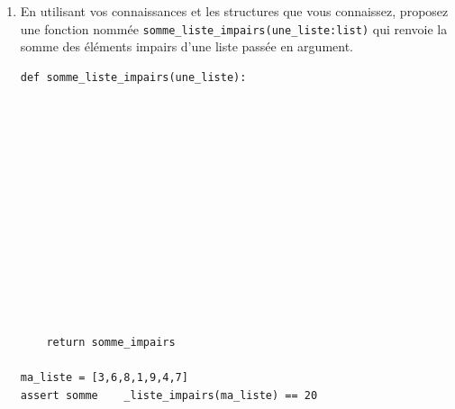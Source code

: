\documentclass[a4paper,12pt,openany]{book}
\begin{document}
\begin{enumerate}
\begin{lstlisting}[numbers=none]
def recherche_minimum(une_liste):
		''' Fonction renvoyant la valeur maximale d'une liste
		Entrée:
		- une_liste: liste de n valeurs de type int
		Sortie:
		- minimum: minimum de la liste (type int) '''
















		return minimum
		
ma_liste = [3,6,8,1,9,4,7]
assert recherche_minimum(ma_liste) == 1
\end{lstlisting}	
	
	
	\bigskip
	
	\item En utilisant vos connaissances et les structures que vous connaissez, proposez une fonction nommée \verb+somme_liste_impairs(une_liste:list)+ qui renvoie la somme des éléments impairs d'une liste passée en argument.
	
\begin{lstlisting}[numbers=none]
def somme_liste_impairs(une_liste):
		
		









		
		
		
	return somme_impairs
	
ma_liste = [3,6,8,1,9,4,7]
assert somme	_liste_impairs(ma_liste) == 20
		
		
		
\end{lstlisting}	

\end{enumerate}
\end{document}
